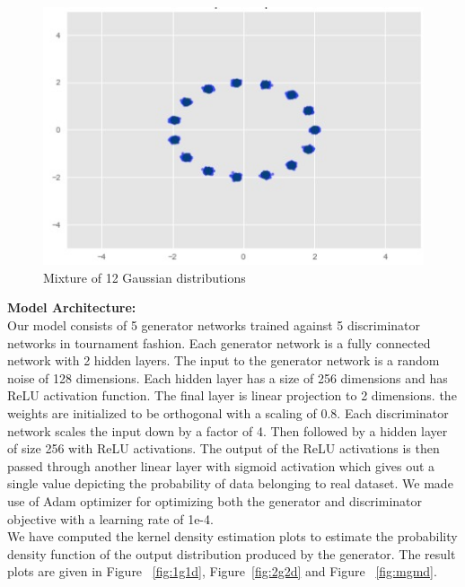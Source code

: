 \documentclass[12pt]{article}
\begin{document}
\begin{figure}[H]
	\centering
	\includegraphics[width=0.6\linewidth]{input.jpeg}
	\caption{Mixture of 12 Gaussian distributions}
	\label{fig:input}
\end{figure}

\noindent\textbf{Model Architecture:}\\
Our model consists of 5 generator networks trained against 5 discriminator networks in tournament fashion.
Each generator network is a fully connected network with 2 hidden layers. The input to the generator network is a random noise of 128 dimensions. Each hidden layer has a size of 256 dimensions and has ReLU activation function. The final layer is linear projection to 2 dimensions. the weights are initialized to be orthogonal with a scaling of 0.8.
Each discriminator network scales the input down by a factor of 4. Then followed by a hidden layer of size 256 with ReLU activations. The output of the ReLU activations is then passed through another linear layer with sigmoid activation which gives out a single value depicting the probability of data belonging to real dataset.
We made use of Adam optimizer for optimizing both the generator and discriminator objective with a learning rate of 1e-4.\\
We have computed the kernel density estimation plots to estimate the probability density function of the output distribution produced by the generator. The result plots are given in Figure ~\ref{fig:1g1d}, Figure~\ref{fig:2g2d} and Figure ~\ref{fig:mgmd}.\\
\end{document}

